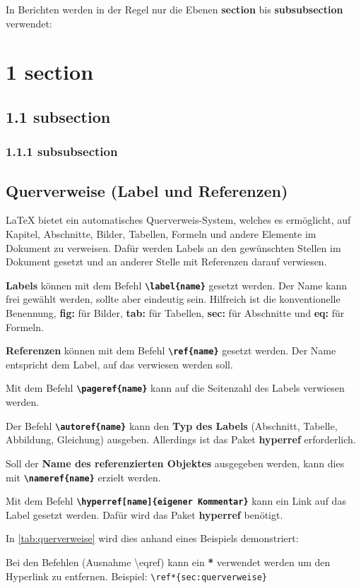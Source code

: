 In Berichten werden in der Regel nur die Ebenen \textbf{section} bis \textbf{subsubsection} verwendet:
\section*{1 \hspace{0.15cm} section}

\subsection*{1.1 \hspace{0.15cm} subsection}

\subsubsection*{1.1.1 \hspace{0.15cm} subsubsection}


\subsection{Querverweise (Label und Referenzen)}
\label{sec:querverweise}
\LaTeX{} bietet ein automatisches Querverweis-System, welches es ermöglicht, auf Kapitel, Abschnitte, Bilder, Tabellen, Formeln und andere Elemente im Dokument zu verweisen.
Dafür werden Labels an den gewünschten Stellen im Dokument gesetzt und an anderer Stelle mit Referenzen darauf verwiesen.

\textbf{Labels} können mit dem Befehl \textbf{\texttt{\textbackslash label\{name\}}} gesetzt werden. Der Name kann frei gewählt werden, sollte aber eindeutig sein. Hilfreich ist die konventionelle Benennung, \textbf{fig:} für Bilder, \textbf{tab:} für Tabellen, \textbf{sec:} für Abschnitte und \textbf{eq:} für Formeln.

\textbf{Referenzen} können mit dem Befehl \textbf{\texttt{\textbackslash ref\{name\}}} gesetzt werden. Der Name entspricht dem Label, auf das verwiesen werden soll.

Mit dem Befehl \textbf{\texttt{\textbackslash pageref\{name\}}} kann auf die Seitenzahl des Labels verwiesen werden.

Der Befehl \textbf{\texttt{\textbackslash autoref\{name\}}} kann den \textbf{Typ des Labels} (Abschnitt, Tabelle, Abbildung, Gleichung) ausgeben. Allerdings ist das Paket \textbf{hyperref} erforderlich.

Soll der \textbf{Name des referenzierten Objektes} ausgegeben werden, kann dies mit \textbf{\texttt{\textbackslash nameref\{name\}}} erzielt werden.

Mit dem Befehl \textbf{\texttt{\textbackslash hyperref[name]\{eigener Kommentar\}}} kann ein Link auf das Label gesetzt werden. Dafür wird das Paket \textbf{hyperref} benötigt.

In \autoref{tab:querverweise} wird dies anhand eines Beispiels demonstriert:


Bei den Befehlen (Ausnahme \textbackslash eqref) kann ein \textbf{*} verwendet werden um den Hyperlink zu entfernen. Beispiel: \texttt{\textbackslash ref*\{sec:querverweise\}}